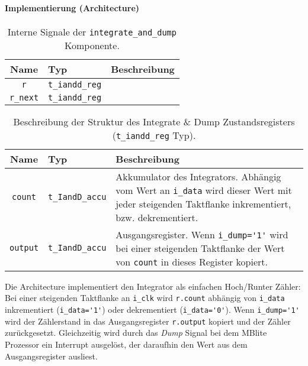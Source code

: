\paragraph{Implementierung (Architecture)}

\begin{table}[htbp]
    \ttabbox
    {
        \caption[Carrier NCO interne Signale]{Interne Signale der \lstinline$integrate_and_dump$ Komponente.}
        \label{TabIandD_ArchSignals}
    }
    {
    \begin{tabular}{c  p{2cm} p{6cm}}
        \toprule
        Name      		& Typ         & Beschreibung \\
        \midrule
        \lstinline$r$		& \lstinline$t_iandd_reg$ & \\
        \lstinline$r_next$	& \lstinline$t_iandd_reg$ & \\
        \bottomrule
    \end{tabular}
}
\end{table}

\begin{table}[htbp]
    \ttabbox
    {
        \caption[Typdefinition Code NCO Zustandsregister]{Beschreibung der Struktur des Integrate \& Dump Zustandsregisters (\lstinline$t_iandd_reg$ Typ).}
        \label{Tab_t_iandd_reg_Type}
    }
    {
    \begin{tabular}{c  p{2cm} p{6cm}}
        \toprule
        Name				& Typ						& Beschreibung \\
        \midrule
        \lstinline$count$		& \lstinline$t_IandD_accu$	&  Akkumulator des Integrators. Abhängig vom Wert an \lstinline$i_data$ wird dieser Wert mit jeder steigenden Taktflanke inkrementiert, bzw. dekrementiert.\\
        \lstinline$output$		& \lstinline$t_IandD_accu$	&  Ausgangsregister. Wenn \lstinline$i_dump='1'$ wird bei einer steigenden Taktflanke der Wert von \lstinline$count$ in dieses Register kopiert. \\
        \bottomrule
    \end{tabular}
}
\end{table}

Die Architecture implementiert den Integrator als einfachen Hoch/Runter Zähler: Bei einer steigenden Taktflanke an \lstinline$i_clk$ wird \lstinline$r.count$ abhängig von \lstinline$i_data$ inkrementiert (\lstinline$i_data='1'$) oder dekrementiert (\lstinline$i_data='0'$). Wenn \lstinline$i_dump='1'$ wird der Zählerstand in das Ausgangsregister \lstinline$r.output$ kopiert und der Zähler zurückgesetzt. Gleichzeitig wird durch das \emph{Dump} Signal bei dem MBlite Prozessor ein Interrupt ausgelöst, der daraufhin den Wert aus dem Ausgangsregister ausliest.
